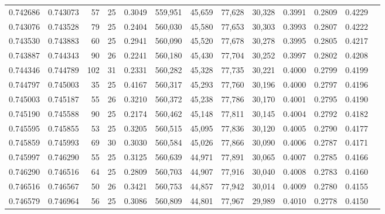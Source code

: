 \begin{tabular}{rrrrrrrrrrrrr}
0.742686 & 0.743073 &    57 &  25 &                                     0.3049 & 559,951 &  45,659 &  77,628 &  30,328 & 0.3991 & 0.2809 & 0.4229 \\
0.743076 & 0.743528 &    79 &  25 &                                     0.2404 & 560,030 &  45,580 &  77,653 &  30,303 & 0.3993 & 0.2807 & 0.4222 \\
0.743530 & 0.743883 &    60 &  25 &                                     0.2941 & 560,090 &  45,520 &  77,678 &  30,278 & 0.3995 & 0.2805 & 0.4217 \\
0.743887 & 0.744343 &    90 &  26 &                                     0.2241 & 560,180 &  45,430 &  77,704 &  30,252 & 0.3997 & 0.2802 & 0.4208 \\
0.744346 & 0.744789 &   102 &  31 &                                     0.2331 & 560,282 &  45,328 &  77,735 &  30,221 & 0.4000 & 0.2799 & 0.4199 \\
0.744797 & 0.745003 &    35 &  25 &                                     0.4167 & 560,317 &  45,293 &  77,760 &  30,196 & 0.4000 & 0.2797 & 0.4196 \\
0.745003 & 0.745187 &    55 &  26 &                                     0.3210 & 560,372 &  45,238 &  77,786 &  30,170 & 0.4001 & 0.2795 & 0.4190 \\
0.745190 & 0.745588 &    90 &  25 &                                     0.2174 & 560,462 &  45,148 &  77,811 &  30,145 & 0.4004 & 0.2792 & 0.4182 \\
0.745595 & 0.745855 &    53 &  25 &                                     0.3205 & 560,515 &  45,095 &  77,836 &  30,120 & 0.4005 & 0.2790 & 0.4177 \\
0.745859 & 0.745993 &    69 &  30 &                                     0.3030 & 560,584 &  45,026 &  77,866 &  30,090 & 0.4006 & 0.2787 & 0.4171 \\
0.745997 & 0.746290 &    55 &  25 &                                     0.3125 & 560,639 &  44,971 &  77,891 &  30,065 & 0.4007 & 0.2785 & 0.4166 \\
0.746290 & 0.746516 &    64 &  25 &                                     0.2809 & 560,703 &  44,907 &  77,916 &  30,040 & 0.4008 & 0.2783 & 0.4160 \\
0.746516 & 0.746567 &    50 &  26 &                                     0.3421 & 560,753 &  44,857 &  77,942 &  30,014 & 0.4009 & 0.2780 & 0.4155 \\
0.746579 & 0.746964 &    56 &  25 &                                     0.3086 & 560,809 &  44,801 &  77,967 &  29,989 & 0.4010 & 0.2778 & 0.4150 \\

\end{tabular}
